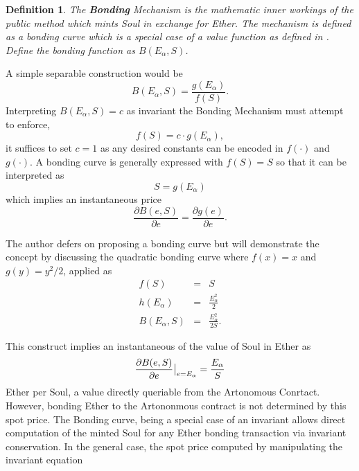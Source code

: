 \documentclass[11pt]{amsart}
\newtheorem{definition}{Definition}
\begin{document}
\begin{definition}
The \textbf{Bonding} Mechanism is the mathematic inner workings of the public method which mints Soul in exchange for Ether. The mechanism is defined as a bonding curve which is a special case of a value function as defined in \cite{MZICCS18}. Define the bonding function as $B(E_\alpha, S)$.
\end{definition}
A simple separable construction would be
\begin{equation}
B(E_\alpha, S) = \frac{g(E_\alpha)}{f(S)}.
\end{equation}
Interpreting $B(E_\alpha, S)=c$ as invariant the Bonding Mechanism must attempt to enforce,
\begin{equation}
{f(S)}=c\cdot{g(E_\alpha)},
\end{equation}
it suffices to set $c=1$ as any desired constants can be encoded in $f(\cdot)$ and $g(\cdot)$.  A bonding curve is generally expressed with $f(S) = S$ so that it can be interpreted as
\begin{equation}
S = g(E_\alpha)
\end{equation}
which implies an instantaneous price
\begin{equation}
\frac{\partial B(e,S)}{\partial e} = \frac{\partial g(e)}{\partial e}.
\end{equation}

The author defers on proposing a bonding curve but will demonstrate the concept by discussing the quadratic bonding curve where $f(x)=x$ and $g(y)=y^2/2$, applied as
\begin{eqnarray}
f(S) &=& S\\
h(E_\alpha) &=& \frac{E_\alpha^2}{2}\\
B(E_\alpha, S) &=& \frac{E_\alpha^2}{2S}.
\end{eqnarray}

This construct implies an instantaneous of the value of Soul in Ether as 
\begin{equation}
\frac{\partial B(e,S)}{\partial e} \big{|}_{e=E_\alpha} = \frac{E_\alpha}{S} \label{spot}
\end{equation}
Ether per Soul, a value directly queriable from the Artonomous Conrtact. However, bonding Ether to the Artononmous contract is not determined by this spot price. The Bonding curve, being a special case of an invariant allows direct computation of the minted Soul for any Ether bonding transaction via invariant conservation. In the general case, the spot price computed by manipulating the invariant equation 
\end{document}
